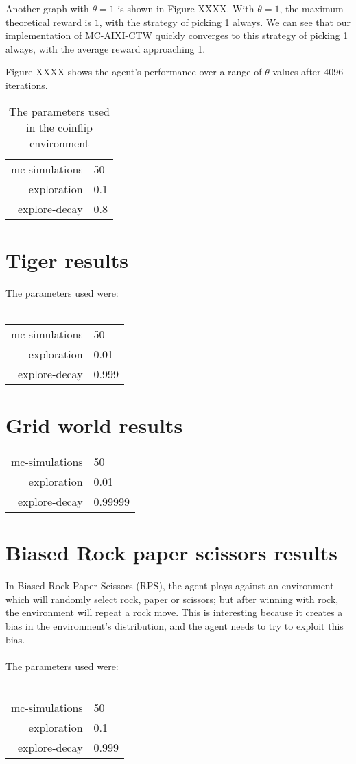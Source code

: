 \documentclass[pdftex,twoside,a4paper]{report}
\newcommand{\mac}{MC-AIXI-CTW}
\begin{document}
Another graph with $\theta = 1$ is shown in Figure XXXX. With $\theta = 1$, the maximum theoretical reward is $1$, with the strategy of picking 1 always. We can see that our implementation of \mac{} quickly converges to this strategy of picking 1 always, with the average reward approaching 1.

Figure XXXX shows the agent's performance over a range of $\theta$ values after 4096 iterations.

\begin{table}
\centering
\begin{tabular}[H]{| r | l | }
\hline
mc-simulations & 50\\
exploration & 0.1\\
explore-decay & 0.8\\
\hline
\end{tabular}
\caption{The parameters used in the coinflip environment}
\end{table}
\section{Tiger results}
The parameters used were:\\\\
\begin{tabular}{| r | l | }
\hline
mc-simulations & 50\\
exploration & 0.01\\
explore-decay & 0.999\\
\hline
\end{tabular}
\section{Grid world results}

\begin{tabular}{| r | l | }
\hline
mc-simulations & 50\\
exploration & 0.01\\
explore-decay & 0.99999\\
\hline
\end{tabular}
\section{Biased Rock paper scissors results}
In Biased Rock Paper Scissors (RPS), the agent plays against an environment which will randomly select rock, paper or scissors; but after winning with rock, the environment will repeat a rock move. This is interesting because it creates a bias in the environment's distribution, and the agent needs to try to exploit this bias.\\\\
The parameters used were:\\\\
\begin{tabular}{| r | l | }
\hline
mc-simulations & 50\\
exploration & 0.1\\
explore-decay & 0.999\\
\hline
\end{tabular}
\end{document}
